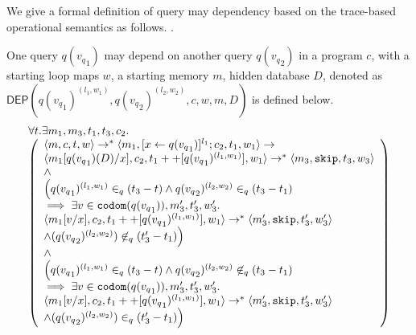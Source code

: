    
   We give a formal definition of query may dependency based on the trace-based operational semantics as follows. .
  
  \begin{defn}
One query $q({v_q}_1)$ may depend on another query $q({v_q}_2)$ in a program $c$, with a starting loop maps $w$, a starting memory $m$, hidden database $D$, denoted as \\
$\mathsf{DEP}(q({v_q}_1)^{(l_1, w_1)}, q({v_q}_2)^{(l_2, w_2)}, c,w, m, D)$ is defined below. 
\[
\begin{array}{l}
\forall  t. \exists m_1,m_3,t_1,t_3,c_2.\\
  \left (\begin{array}{l}   
\langle m, c,  t,w \rangle \rightarrow^{*} \langle m_1, [\mathrel{ x \leftarrow q({v_q}_1) }]^{l_1} ; c_2,
  t_1,w_1 \rangle \rightarrow \\ \langle m_1[q({v_q}_1)(D)/x], c_2,
  t_1++[q({v_q}_1)^{(l_1, w_1)}], w_1 \rangle \rightarrow^{*} \langle m_3, \mathtt{skip},
  t_3,w_3 \rangle \\  
  \land \\
\Big( q({v_q}_1)^{(l_1,w_1)} \in_{q} (t_3-t) \land q({v_q}_2)^{(l_2,w_2)} \in_{q} (t_3-t_1) \\ \implies  \exists v \in \mathtt{codom}(q({v_q}_1)), m_3', t_3', w_3'.  \\
 \langle m_1[v/x], {c_2}, t_1++[q({v_q}_1)^{(l_1,w_1)}], w_1 \rangle \rightarrow^{*} \langle m_3', \mathtt{skip}, t_3', w_3' \rangle \\ \land (q({v_q}_2)^{(l_2,w_2)}) \not \in_{q} (t_3'-t_1)
\Big)\\
\land \\
\Big(q({v_q}_1)^{(l_1,w_1)} \in_{q} (t_3-t) \land q({v_q}_2)^{(l_2,w_2)} \not\in_{q} (t_3-t_1) \\ \implies  \exists v \in \mathtt{codom}(q({v_q}_1)),  m_3', t_3', w_3'. \\
 \langle m_1[v/x], {c_2}, t_1++[q({v_q}_1)^{(l_1,w_1)}], w_1 \rangle \rightarrow^{*} \langle m_3', \mathtt{skip}, t_3', w_3' \rangle \\ \land (q({v_q}_2)^{(l_2,w_2)})  \in_{q} (t_3'-t_1)
\Big)
\end{array} \right )
\end{array}
\]
\end{defn}
  
